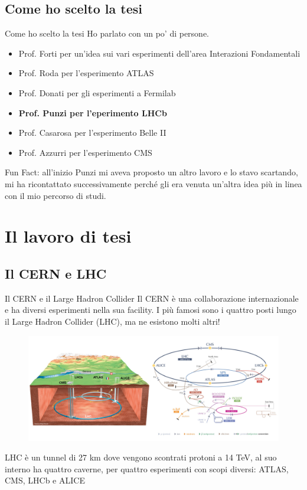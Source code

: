 \documentclass[
10pt,
aspectratio=169,
]{beamer}
\begin{document}
\subsection{Come ho scelto la tesi}
\begin{frame}{Come ho scelto la tesi}
Ho parlato con un po' di persone.
\begin{itemize}
    \item Prof. Forti per un'idea sui vari esperimenti dell'area Interazioni Fondamentali
    \item Prof. Roda per l'esperimento ATLAS
    \item Prof. Donati per gli esperimenti a Fermilab
    \item \textbf{Prof. Punzi per l'eperimento LHCb}
    \item Prof. Casarosa per l'esperimento Belle II
    \item Prof. Azzurri per l'esperimento CMS
\end{itemize}
\vfill
Fun Fact: all'inizio Punzi mi aveva proposto un altro lavoro e lo stavo scartando, mi ha ricontattato successivamente perché gli era venuta un'altra idea più in linea con il mio percorso di studi.
\end{frame}
\section{Il lavoro di tesi}
\subsection{Il CERN e LHC}
\begin{frame}{Il CERN e il Large Hadron Collider}
Il CERN è una collaborazione internazionale e ha diversi esperimenti nella sua facility. I più famosi sono i quattro posti lungo il Large Hadron Collider (LHC), ma ne esistono molti altri!
\begin{figure}
    \centering
    \includegraphics[width=0.8\linewidth]{lhc.png}
\end{figure}
    LHC è un tunnel di 27 km dove vengono scontrati protoni a 14 TeV, al suo interno ha quattro caverne, per quattro esperimenti con scopi diversi: ATLAS, CMS, LHCb e ALICE
\end{frame}
\end{document}
